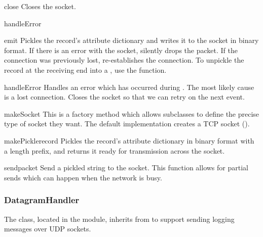 \begin{methoddesc}{close}{}
Closes the socket.
\end{methoddesc}

\begin{methoddesc}{handleError}{}
\end{methoddesc}

\begin{methoddesc}{emit}{}
Pickles the record's attribute dictionary and writes it to the socket in
binary format. If there is an error with the socket, silently drops the
packet. If the connection was previously lost, re-establishes the connection.
To unpickle the record at the receiving end into a , use the
 function.
\end{methoddesc}

\begin{methoddesc}{handleError}{}
Handles an error which has occurred during . The
most likely cause is a lost connection. Closes the socket so that
we can retry on the next event.
\end{methoddesc}

\begin{methoddesc}{makeSocket}{}
This is a factory method which allows subclasses to define the precise
type of socket they want. The default implementation creates a TCP
socket ().
\end{methoddesc}

\begin{methoddesc}{makePickle}{record}
Pickles the record's attribute dictionary in binary format with a length
prefix, and returns it ready for transmission across the socket.
\end{methoddesc}

\begin{methoddesc}{send}{packet}
Send a pickled string  to the socket. This function allows
for partial sends which can happen when the network is busy.
\end{methoddesc}

\subsubsection{DatagramHandler}

The  class, located in the
 module, inherits from 
to support sending logging messages over UDP sockets.

